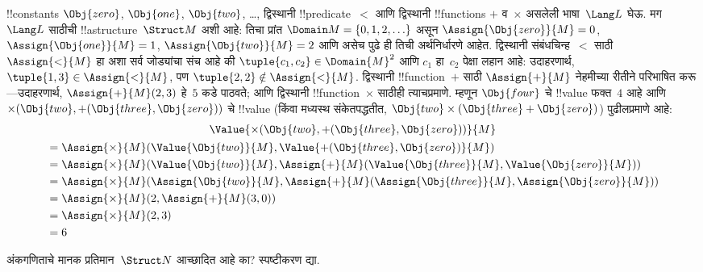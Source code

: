 \documentclass[../../../include/open-logic-section]{subfiles}
\begin{document}
\begin{ex}
!!{constant}s $\Obj{zero}$, $\Obj{one}$, $\Obj{two}$, \dots, द्विस्थानी
!!{predicate}~$<$ आणि द्विस्थानी !!{function}s $+$ व~$\times$ असलेली
भाषा~$\Lang L$ घेऊ. मग~$\Lang L$ साठीची !!a{structure}~$\Struct M$ अशी
आहे: तिचा प्रांत $\Domain M = \{0, 1, 2, \ldots \}$ असून
$\Assign{\Obj{zero}}{M} = 0$, $\Assign{\Obj{one}}{M} = 1$,
$\Assign{\Obj{two}}{M} = 2$ आणि असेच पुढे ही तिची अर्थनिर्धारणे आहेत.
द्विस्थानी संबंधचिन्ह~$<$ साठी $\Assign{<}{M}$ हा अशा सर्व जोड्यांचा
संच आहे की $\tuple{c_1, c_2} \in \Domain{M}^2$ आणि $c_1$ हा~$c_2$ पेक्षा
लहान आहे: उदाहरणार्थ, $\tuple{1, 3} \in \Assign{<}{M}$, पण
$\tuple{2, 2} \notin \Assign{<}{M}$. द्विस्थानी !!{function}~$+$ साठी
$\Assign{+}{M}$ नेहमीच्या रीतीने परिभाषित करू---उदाहरणार्थ,
$\Assign{+}{M}(2,3)$ हे~$5$ कडे पाठवते; आणि द्विस्थानी
!!{function}~$\times$ साठीही त्याचप्रमाणे. म्हणून $\Obj{four}$ चे
!!{value} फक्त~$4$ आहे आणि $\times(\Obj{two},
+(\Obj{three},\Obj{zero}))$ चे !!{value} (किंवा मध्यस्थ संकेतपद्धतीत,
$\Obj{two} \times (\Obj{three} + \Obj{zero})$) पुढीलप्रमाणे आहे:
%
\begin{multline*}
\Value{\times(\Obj{two}, +(\Obj{three},\Obj{zero}))}{M} \\
\begin{aligned}
& =\Assign{\times}{M}(\Value{\Obj{two}}{M}, \Value{+(\Obj{three}, \Obj{zero})}{M})\\
& = \Assign{\times}{M}(\Value{\Obj{two}}{M}, \Assign{+}{M}(\Value{\Obj{three}}{M},
\Value{\Obj{zero}}{M})) \\
& = \Assign{\times}{M}(\Assign{\Obj{two}}{M}, \Assign{+}{M}(\Assign{\Obj{three}}{M},
\Assign{\Obj{zero}}{M})) \\
& = \Assign{\times}{M}(2, \Assign{+}{M}(3, 0)) \\
& = \Assign{\times}{M}(2, 3) \\
& = 6
\end{aligned}
\end{multline*}
\end{ex}

\begin{prob}
अंकगणिताचे मानक प्रतिमान~$\Struct N$ आच्छादित आहे का? स्पष्टीकरण द्या.
\end{prob}
\end{document}
